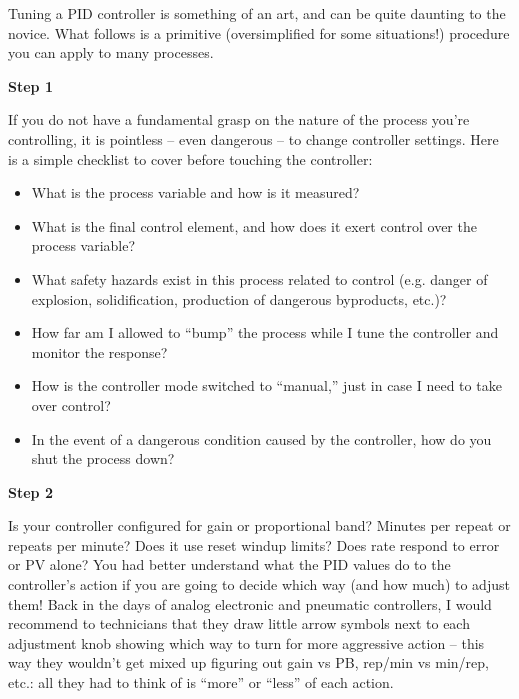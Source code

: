 \documentclass[12pt,a4paper]{book}
\begin{document}
\vskip 10pt

Tuning a PID controller is something of an art, and can be quite daunting to the novice.  What follows is a primitive (oversimplified for some situations!) procedure you can apply to many processes.

\vskip 10pt

\noindent
{\bf Step 1}

  If you do not have a fundamental grasp on the nature of the process you're controlling, it is pointless -- even dangerous -- to change controller settings.  Here is a simple checklist to cover before touching the controller:

\begin{itemize}
\item{} What is the process variable and how is it measured?
\item{} What is the final control element, and how does it exert control over the process variable?
\item{} What safety hazards exist in this process related to control (e.g. danger of explosion, solidification, production of dangerous byproducts, etc.)?  
\item{} How far am I allowed to ``bump'' the process while I tune the controller and monitor the response?
\item{} How is the controller mode switched to ``manual,'' just in case I need to take over control?
\item{} In the event of a dangerous condition caused by the controller, how do you shut the process down?
\end{itemize}

\vskip 10pt

\noindent
{\bf Step 2}

  Is your controller configured for gain or proportional band?  Minutes per repeat or repeats per minute?  Does it use reset windup limits?  Does rate respond to error or PV alone?  You had better understand what the PID values do to the controller's action if you are going to decide which way (and how much) to adjust them!  Back in the days of analog electronic and pneumatic controllers, I would recommend to technicians that they draw little arrow symbols next to each adjustment knob showing which way to turn for more aggressive action -- this way they wouldn't get mixed up figuring out gain vs PB, rep/min vs min/rep, etc.: all they had to think of is ``more'' or ``less'' of each action.
\end{document}
